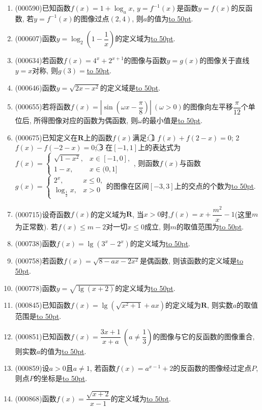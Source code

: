 \documentclass[10pt,a4paper]{article}
\newcommand{\blank}[1]{\underline{\hbox to #1pt{}}}
\begin{document}
\begin{enumerate}[1.]
\item {\tiny (000590)}已知函数$f(x)=1+\log_a x$, $y=f^{-1}(x)$是函数$y=f(x)$的反函数, 若$y=f^{-1}(x)$的图像过点$(2,4)$, 则$a$的值为\blank{50}.
\item {\tiny (000607)}函数$y=\log_2(1-\dfrac1x)$的定义域为\blank{50}.
\item {\tiny (000634)}若函数$f(x)=4^x+2^{x+1}$的图像与函数$y=g(x)$的图像关于直线$y=x$对称, 则$g(3)=$\blank{50}.
\item {\tiny (000646)}函数$y=\sqrt{2x-x^2}$的定义域是\blank{50}.
\item {\tiny (000655)}若将函数$f(x)=|\sin(\omega x-\dfrac{\pi}8)| \ (\omega >0)$的图像向左平移$\dfrac{\pi}{12}$个单位后, 所得图像对应的函数为偶函数, 则$\omega$的最小值是\blank{50}.
\item {\tiny (000675)}已知定义在$\mathbf{R}$上的函数$f(x)$满足: \textcircled{1} $f(x)+f(2-x)=0$; \textcircled{2} $f(x)-f(-2-x)=0$; \textcircled{3} 在$[-1,1]$上的表达式为$f(x)=\begin{cases} \sqrt{1-x^2}, & x\in [-1,0], \\ 1-x, & x\in (0,1] \end{cases}$, 则函数$f(x)$与函数$g(x)=\begin{cases} 2^x, & x\le 0, \\ \log_{\frac12} x,& x>0 \end{cases}$的图像在区间$[-3,3]$上的交点的个数为\blank{50}.
\item {\tiny (000715)}设奇函数$f(x)$的定义域为$\mathbf{R}$, 当$x>0$时,$f(x)=x+\dfrac{m^2}x-1$(这里$m$为正常数). 若$f(x)\le m-2$对一切$x\le 0$成立, 则$m$的取值范围为\blank{50}.
\item {\tiny (000738)}函数$f(x)=\lg (3^x-2^x)$的定义域为\blank{50}.
\item {\tiny (000758)}若函数$f(x)=\sqrt{8-ax-2x^2}$是偶函数, 则该函数的定义域是\blank{50}.
\item {\tiny (000778)}函数$y=\sqrt{\lg(x+2)}$的定义域为\blank{50}.
\item {\tiny (000845)}已知函数$f(x)=\lg (\sqrt{x^2+1}+ax)$的定义域为$\mathbf{R}$, 则实数$a$的取值范围是\blank{50}.
\item {\tiny (000851)}已知函数$f(x)=\dfrac{3x+1}{x+a}\ (a\ne \dfrac13)$的图像与它的反函数的图像重合, 则实数$a$的值为\blank{50}.
\item {\tiny (000859)}设$a>0$且$a\ne 1$, 若函数$f(x)=a^{x-1}+2$的反函数的图像经过定点$P$, 则点$P$的坐标是\blank{50}.
\item {\tiny (000868)}函数$f(x)=\dfrac{\sqrt{x+2}}{x-1}$的定义域为\blank{50}.

\end{enumerate}
\end{document}
